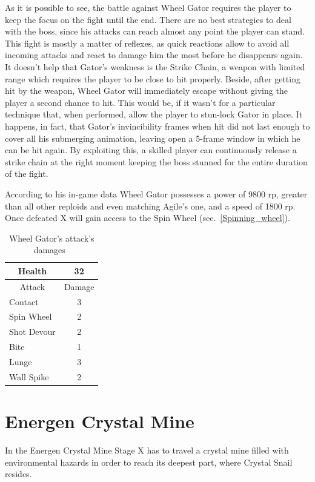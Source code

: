 As it is possible to see, the battle against Wheel Gator requires the player to keep the focus on the fight until the end. There are no best strategies to deal with the boss, since his attacks can reach almost any point the player can stand. This fight is mostly a matter of reflexes, as quick reactions allow to avoid all incoming attacks and react to damage him the most before he disappears again. It doesn't help that Gator's weakness is the Strike Chain, a weapon with limited range which requires the player to be close to hit properly. Beside, after getting hit by the weapon, Wheel Gator will immediately escape without giving the player a second chance to hit. This would be, if it wasn't for a particular technique that, when performed, allow the player to stun-lock Gator in place. It happens, in fact, that Gator's invincibility frames when hit did not last enough to cover all his submerging animation, leaving open a 5-frame window in which he can be hit again. By exploiting this, a skilled player can continuously release a strike chain at the right moment keeping the boss stunned for the entire duration of the fight.

According to his in-game data Wheel Gator possesses a power of 9800 rp, greater than all other reploids and even matching Agile's one, and a speed of 1800 rp. Once defeated X will gain access to the Spin Wheel (sec.~\ref{Spinning_wheel}).


\begin{table}[htp]
	\centering
	\begin{tabular}[h]{l c}
		\toprule
		\multicolumn{1}{c}{Health}  & 32 \\
		\midrule
		\multicolumn{1}{c}{Attack} & \multicolumn{1}{c}{Damage}\\
		Contact & 3 \\
		Spin Wheel & 2\\
		Shot Devour & 2\\
		Bite & 1\\
		Lunge& 3\\
		Wall Spike& 2\\
		\bottomrule
	\end{tabular}
	\caption{Wheel Gator's attack's damages~\cite{wiki:Wheel_gator}}
\end{table}

\section{Energen Crystal Mine}
In the Energen Crystal Mine Stage X has to travel a crystal mine filled with environmental hazards in order to reach its deepest part, where Crystal Snail resides.

